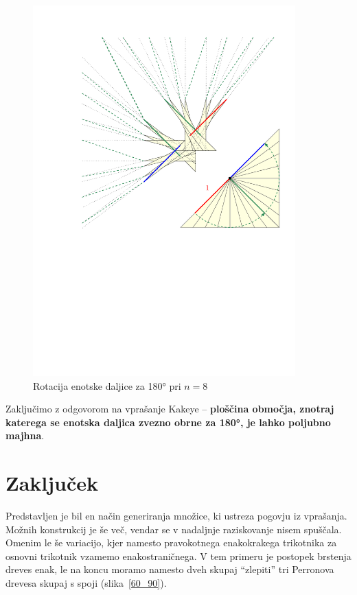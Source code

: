 \documentclass[a4paper, 12pt]{article}
\begin{document}
\begin{figure}[h!]
    \centering
    \includegraphics[width=0.9\textwidth]{ipe_slike/prehod_skupaj.pdf}
    \caption{Rotacija enotske daljice za 180° pri $ n = 8 $}
    \label{zdruzitev}
\end{figure}

Zaključimo z odgovorom na vprašanje Kakeye -- \textbf{ploščina območja, znotraj katerega se enotska daljica zvezno obrne za 180°, je lahko poljubno majhna}.

\section*{Zaključek}

Predstavljen je bil en način generiranja množice, ki ustreza pogovju iz vprašanja. Možnih konstrukcij je še več, vendar se v nadaljnje raziskovanje nisem spuščala. Omenim le še variacijo, kjer namesto pravokotnega enakokrakega trikotnika za osnovni trikotnik vzamemo enakostraničnega. V tem primeru je postopek brstenja dreves enak, le na koncu moramo namesto dveh skupaj ``zlepiti'' tri Perronova drevesa skupaj s spoji (slika~\ref{60_90}).
\end{document}
